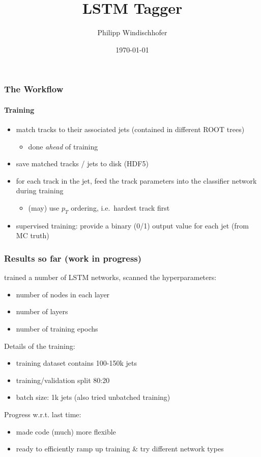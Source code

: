 \documentclass{beamer}
\title{LSTM Tagger}
\author{Philipp Windischhofer}
\date{\today}
\begin{document}
 
\frame{\titlepage}


\begin{frame}
  \frametitle{The Workflow}
  \framesubtitle{Training}
  \begin{itemize}
  \item match tracks to their associated jets (contained in different ROOT trees)
    \begin{itemize}
      \item done \textsl{ahead} of training
    \end{itemize}
  \item save matched tracks / jets to disk (HDF5)
  \item for each track in the jet, feed the track parameters into the classifier network during training
    \begin{itemize}
      \item (may) use $p_T$ ordering, i.e.~hardest track first
    \end{itemize}
  \item supervised training: provide a binary (0/1) output value for each jet (from MC truth)
  \end{itemize}

\end{frame}

\begin{frame}
  \frametitle{Results so far (work in progress)}
  trained a number of LSTM networks, scanned the hyperparameters:
    \begin{itemize}
    \item number of nodes in each layer
    \item number of layers
    \item number of training epochs
    \end{itemize}
  
  Details of the training:
  \begin{itemize}
  \item training dataset contains 100-150k jets
  \item training/validation split 80:20
  \item batch size: 1k jets (also tried unbatched training)
  \end{itemize}

  Progress w.r.t. last time:
  \begin{itemize}
    \item made code (much) more flexible
    \item ready to efficiently ramp up training \& try different network types
  \end{itemize}  
\end{frame}
\end{document}
